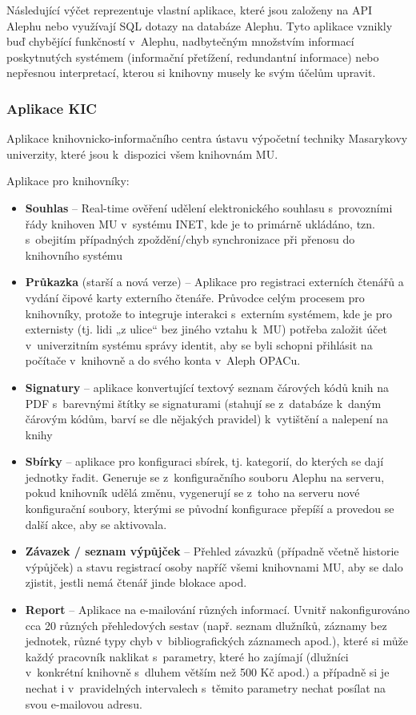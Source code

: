 \documentclass[
	11pt, oneside, printed, draft, 
	table,   %
	lof,     %
	lot     %
]{fithesis3}
\newcommand{\bold}[1]{\textbf{#1}}
\begin{document}
{Následující výčet reprezentuje vlastní aplikace, které jsou založeny na API Alephu nebo využívají SQL dotazy na databáze Alephu. Tyto aplikace vznikly buď chybějící funkčností v~Alephu, nadbytečným množstvím informací poskytnutých systémem (informační přetížení, redundantní informace) nebo nepřesnou interpretací, kterou si knihovny musely ke svým účelům upravit.

\subsubsection{Aplikace KIC}
Aplikace knihovnicko-informačního centra ústavu výpočetní techniky Masarykovy univerzity, které jsou k~dispozici všem knihovnám MU.

Aplikace pro knihovníky:

\begin{itemize}
\item \bold{Souhlas} – Real-time ověření udělení elektronického souhlasu s~provozními řády knihoven MU v~systému INET, kde je to primárně ukládáno, tzn. s~obejitím případných zpoždění/chyb synchronizace při přenosu do knihovního systému
\item \bold{Průkazka} (starší a nová verze) – Aplikace pro registraci externích čtenářů a vydání čipové karty externího čtenáře. Průvodce celým procesem pro knihovníky, protože to integruje interakci s~externím systémem, kde je pro externisty (tj. lidi „z ulice“ bez jiného vztahu k~MU) potřeba založit účet v~univerzitním systému správy identit, aby se byli schopni přihlásit na počítače v~knihovně a do svého konta v~Aleph OPACu.
\item \bold{Signatury} – aplikace konvertující textový seznam čárových kódů knih na PDF s~barevnými štítky se signaturami (stahují se z~databáze k~daným čárovým kódům, barví se dle nějakých pravidel) k~vytištění a nalepení na knihy
\item \bold{Sbírky} – aplikace pro konfiguraci sbírek, tj. kategorií, do kterých se dají jednotky řadit. Generuje se z~konfiguračního souboru Alephu na serveru, pokud knihovník udělá změnu, vygenerují se z~toho na serveru nové konfigurační soubory, kterými se původní konfigurace přepíší a provedou se další akce, aby se aktivovala.
\item \bold{Závazek / seznam výpůjček} – Přehled závazků (případně včetně historie výpůjček) a stavu registrací osoby napříč všemi knihovnami MU, aby se dalo zjistit, jestli nemá čtenář jinde blokace apod.
\item \bold{Report} – Aplikace na e-mailování různých informací. Uvnitř nakonfigurováno cca 20 různých přehledových sestav (např. seznam dlužníků, záznamy bez jednotek, různé typy chyb v~bibliografických záznamech apod.), které si může každý pracovník naklikat s~parametry, které ho zajímají (dlužníci v~konkrétní knihovně s~dluhem větším než 500 Kč apod.) a případně si je nechat i v~pravidelných intervalech s~těmito parametry nechat posílat na svou e-mailovou adresu.

\end{itemize}}
\end{document}

